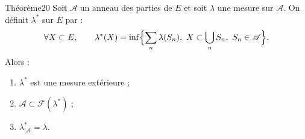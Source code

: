 \documentclass[11pt,a4paper]{article}
\newcommand{\A}{\mathscr{A}}
\newcommand{\Ff}{\mathscr{F}}
\begin{document}
\begin{enonce}{Théorème}{20}
Soit $\A$ un anneau des parties de $E$ et soit $\lambda$ une mesure sur $\A$. On définit $\lambda^*$ sur $E$ par :
\[
  \forall X\subset E,\qquad \lambda^*(X)=\inf\Bigl\{\sum_n\lambda(S_n),\ X\subset\bigcup_nS_n,\ S_n\in\A\Bigr\}.
\]
Alors :
\begin{enumerate}[label=\textbf{\arabic*-},leftmargin=1.2cm]
  \item $\lambda^*$ est une mesure extérieure ;
  \item $\A\subset\Ff(\lambda^*)$ ;
  \item $\lambda^*_{|\A}=\lambda$.
\end{enumerate}
\end{enonce}
\end{document}

